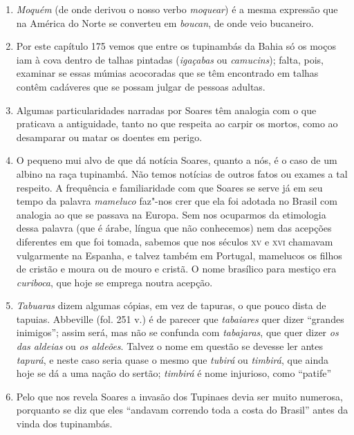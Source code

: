 \begin{enumerate}
\item \textit{Moquém} (de onde derivou o nosso verbo \textit{moquear}) é a mesma expressão que na 
América do Norte se converteu em \textit{boucan}, de onde veio bucaneiro.

\item Por este capítulo 175 vemos que entre os tupinambás da Bahia só os moços iam à 
cova dentro de talhas pintadas (\textit{igaçabas} ou \textit{camucins}); falta, pois, examinar se essas 
múmias acocoradas que se têm encontrado em talhas contêm cadáveres que se possam 
julgar de pessoas adultas.

\item Algumas particularidades narradas por Soares têm analogia com o que praticava a 
antiguidade, tanto no que respeita ao carpir os mortos, como ao desamparar ou matar os 
doentes em perigo.

\item O pequeno mui alvo de que dá notícia Soares, quanto a nós, é o caso de um albino 
na raça tupinambá. Não temos notícias de outros fatos ou exames a tal respeito.
A frequência e familiaridade com que Soares se serve já em seu tempo da palavra 
\textit{mameluco} faz"-nos crer que ela foi adotada no Brasil com analogia ao que se passava na 
Europa. Sem nos ocuparmos da etimologia dessa palavra (que é árabe, língua que não 
conhecemos) nem das acepções diferentes em que foi tomada, sabemos que nos séculos \textsc{xv} e 
\textsc{xvi} chamavam vulgarmente na Espanha, e talvez também em Portugal, mamelucos os 
filhos de cristão e moura ou de mouro e cristã. O nome brasílico para mestiço era \textit{curiboca}, 
que hoje se emprega noutra acepção.

\item  \textit{Tabuaras} dizem algumas cópias, em vez de tapuras, o que pouco
dista de tapuias. Abbeville (fol. 251 v.) é de parecer que \textit{tabaiares} quer
dizer ``grandes inimigos'';  assim será, mas não se confunda com \textit{tabajaras}, que quer 
dizer \textit{os das aldeias} ou \textit{os aldeões}.  Talvez o nome em questão se devesse ler 
antes \textit{tapurá}, e neste caso seria quase o mesmo que \textit{tubirá} ou \textit{timbirá}, que ainda hoje se dá a 
uma nação do sertão; \textit{timbirá} é nome injurioso, como ``patife'' 

\item Pelo que nos revela Soares a invasão dos Tupinaes devia ser muito numerosa, 
porquanto se diz que eles ``andavam correndo toda a costa do Brasil''  antes da vinda 
dos tupinambás.


\end{enumerate}
